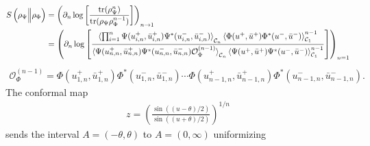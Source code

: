 \documentclass[11pt]{article}
\newcommand{\p}{\partial}
\newcommand{\mO}{\mathcal{O}}
\newcommand{\nn}{\nonumber}
\newcommand{\lb}{\left(}
\newcommand{\rb}{\right)}
\newcommand{\JM}[1]{\textcolor{orange}{#1}}
\begin{document}
  \begin{align}\label{relEntropyReplica}
    S\left(\rho_\Psi \Big\| \rho_\Phi\right)&=\lb \partial_{n}
    \log \left[ \frac{\text{tr}(\rho_{\Psi}^{n})}{\text{tr}(\rho_{\Psi}\rho_{\Phi}^{n-1})}
    \right]\rb_{n\to 1}\nn\\
    &=\lb
    \p_n\log\left[
    \frac{\braket{\prod_{i=1}^{n} \Psi(u^+_{i,n}, \bar u_{i,n}^+)\Psi^*(u^-_{i,n},\bar u_{i,n}^-)}_{\mathcal{C}_n}\braket{\Phi(u^+,\bar u^+)\Phi^*(u^-,\bar u^-)}_{\mathcal{C}_1}^{n-1}}{\braket{\Psi(u^+_{n,n}, \bar u_{n,n}^+)\Psi^*(u^-_{n,n},\bar u_{n,n}^-)\mO^{(n-1)}_{\Phi}}_{\mathcal{C}_n}\braket{\Psi(u^+,\bar u^+)\Psi^*(u^-,\bar u^-)}_{\mathcal{C}_1}^{n-1}}\right]
    \rb_{n=1}\\
  \end{align}
  \begin{eqnarray}\label{corrFncyl}
    \mO_{\Phi}^{(n-1)}=
    \Phi(u_{1,n}^+,\bar u_{1,n}^+)\Phi^*(u_{1,n}^-, \bar u_{1,n}^-)\cdots \Phi(u_{n-1,n}^+,\bar u_{n-1,n}^+)\Phi^*(u_{n-1,n}^-,\bar u_{n-1,n}^-).
  \end{eqnarray}
   The conformal map
  \begin{eqnarray}
    z=\lb\frac{\sin((u-\theta)/2)}{\sin((u+\theta)/2)}\rb^{1/n}
  \end{eqnarray}
  sends the interval $A=(-\theta,\theta)$ to $A=(0,\infty)$ uniformizing
\end{document}
